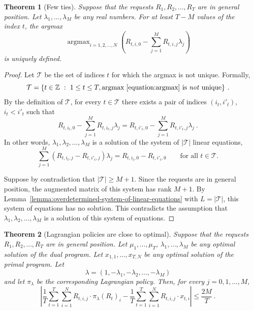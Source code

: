\documentclass[12pt]{article}
\newcommand{\Z}{\mathbb{Z}}
\newcommand{\T}{\mathcal{T}}
\DeclareMathOperator*{\argmax}{argmax}
\newtheorem{theorem}{Theorem}
\theoremstyle{definition}
\begin{document}
\begin{theorem}[Few ties]
\label{theorem:few-ties}
Suppose that the requests $R_1, R_2, \dots, R_T$ are in general position. Let
$\lambda_1, \dots, \lambda_M$ be any real numbers. For at least $T-M$ values of
the index $t$, the argmax
\begin{equation}
\label{equation:argmax}
\argmax_{i=1,2,\dots,N} \left( R_{t,i,0} - \sum_{j=1}^M R_{t,i,j} \lambda_j \right)
\end{equation}
is uniquely defined.
\end{theorem}

\begin{proof}
Let $\T$ be the set of indices $t$ for which the argmax is not unique. Formally,
$$
\T = \left\{ t \in \Z ~:~ 1 \le t \le T, \text{argmax \eqref{equation:argmax} is \emph{not} unique} \right\} \: .
$$
By the definition of $\T$, for every $t \in \T$
there exists a pair of indices $(i_t,i'_t)$, $i_t < i'_t$ such that
$$
R_{t,i_t,0} - \sum_{j=1}^M R_{t,i_t,j} \lambda_j = R_{t,i'_t,0} - \sum_{j=1}^M R_{t,i'_t,j} \lambda_j \: .
$$
In other words, $\lambda_1, \lambda_2, \dots, \lambda_M$ is a solution of the
system of $|\T|$ linear equations,
$$
\sum_{j=1}^M (R_{t,i_t,j} - R_{t,i'_t,j}) \lambda_j = R_{t,i_t,0} - R_{t,i'_t,0} \qquad \text{for all $t \in \T$.}
$$

Suppose by contradiction that $|\T| \ge M + 1$. Since the requests are in
general position, the augmented matrix of this system has rank $M+1$. By
Lemma~\ref{lemma:overdetermined-system-of-linear-equations} with $L = |\T|$,
this system of equations has no solution. This contradicts the assumption that
$\lambda_1, \lambda_2, \dots, \lambda_M$ is a solution of this system of
equations.
\end{proof}

\begin{theorem}[Lagrangian policies are close to optimal]
\label{theorem:lagrangian-policies-are-close-to-optimal}
Suppose that the requests $R_1, R_2, \dots, R_T$ are in general position. Let
$\mu_1, \dots, \mu_T$, $\lambda_1, \dots, \lambda_M$ be any optimal solution of
the dual program. Let $x_{1,1}, \dots, x_{T,N}$ be any optimal solution of the
primal program. Let
$$
\lambda = (1, - \lambda_1, - \lambda_2, \dots, - \lambda_M)
$$
and let $\pi_\lambda$ be the corresponding Lagrangian policy. Then,
for every $j=0,1,\dots,M$,
$$
\left| \frac{1}{T} \sum_{t=1}^T \sum_{i=1}^N R_{t,i,j} \cdot \pi_\lambda(R_t)_i - \frac{1}{T} \sum_{t=1}^T \sum_{i=1}^N R_{t,i,j} \cdot x_{t,i}  \right| \le \frac{2M}{T} \: .
$$
\end{theorem}
\end{document}
